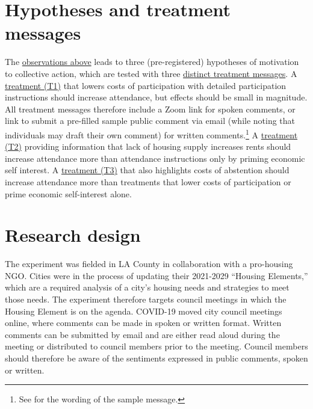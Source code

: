 \documentclass[12pt,final,fleqn]{article}
\theoremstyle{plain}
\begin{document}
\section{Hypotheses and treatment messages}\label{theory: treatments}

The \hyperref[theory: renters]{observations above} leads to three (pre-registered) hypotheses of motivation to collective action, which are tested with three \hyperref[fig: treatments]{distinct treatment messages}. A \hyperref[subfig: T1]{treatment (T1)} that lowers costs of participation with detailed participation instructions should increase attendance, but  effects should be small in magnitude. All treatment messages therefore include a Zoom link for spoken comments, or link to submit a pre-filled sample public comment via email (while noting that individuals may draft their own comment) for written comments.\footnote{See  for the wording of the sample message.} A \hyperref[subfig: T2]{treatment (T2)} providing information that lack of housing supply increases rents should increase attendance more than attendance instructions only by  priming economic self interest. A \hyperref[subfig: T3]{treatment (T3)} that also highlights costs of abstention should increase attendance more than treatments that lower costs of participation or prime economic self-interest alone. 
 
 
\section{Research design}

The experiment was fielded in LA County in collaboration with a pro-housing NGO. Cities were in the process of updating their 2021-2029 ``Housing Elements,'' which are a required analysis of a city's housing needs and strategies to meet those needs. The experiment therefore targets council meetings in which the Housing Element is on the agenda. COVID-19 moved city council meetings online, where comments can be made in spoken or written format. Written comments can be submitted by email and are either read aloud during the meeting or distributed to council members prior to the meeting. Council members should therefore be aware of the sentiments expressed in public comments, spoken or written.
\end{document}

